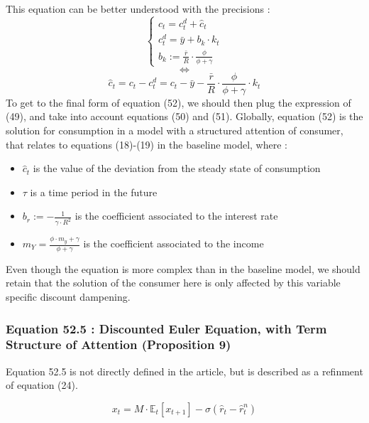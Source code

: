\documentclass{article}
\begin{document}
This equation can be better understood with the precisions : 
\begin{equation*}
    \begin{cases}
        c_{t}=c_{t}^{d}+\hat{c}_{t} \\ 
        c^{d}_{t} = \bar{y} + b_{k}\cdot k_{t} \\
        b_{k}:=\frac{\bar{r}}{R}\cdot\frac{\phi}{\phi+\gamma}
    \end{cases}
\end{equation*}
$$\iff$$
\begin{equation*}
    \hat{c}_{t}=c_{t}-c_{t}^{d}=c_{t}-\bar{y} - \frac{\bar{r}}{R}\cdot\frac{\phi}{\phi+\gamma}\cdot k_{t}
\end{equation*}
To get to the final form of equation (52), we should then plug the expression of (49), and take into account equations (50) and (51).
Globally, equation (52) is the solution for consumption in a model with a structured attention of consumer, that relates to equations (18)-(19) in the baseline model, where : 
\begin{itemize}
    \item $\hat{c}_{t}$ is the value of the deviation from the steady state of consumption
    \item $\tau$ is a time period in the future
    \item $b_{r}:=-\frac{1}{\gamma\cdot R^{2}}$ is the coefficient associated to the interest rate
    \item $m_{Y}=\frac{\phi\cdot m_{y}+\gamma}{\phi+\gamma}$ is the coefficient associated to the income
\end{itemize}

Even though the equation is more complex than in the baseline model, we should retain that the solution of the consumer here is only affected by this variable specific discount dampening. 

\subsubsection*{Equation 52.5 : Discounted Euler Equation, with Term Structure of Attention (Proposition 9)}

Equation 52.5 is not directly defined in the article, but is described as a refinment of equation (24).

\begin{equation*}\tag{52.5}
    x_{t}=M\cdot\mathbb{E}_{t}\left[x_{t+1}\right]-\sigma(\hat{r}_{t}-\hat{r}^{n}_{t})
\end{equation*}
\end{document}
